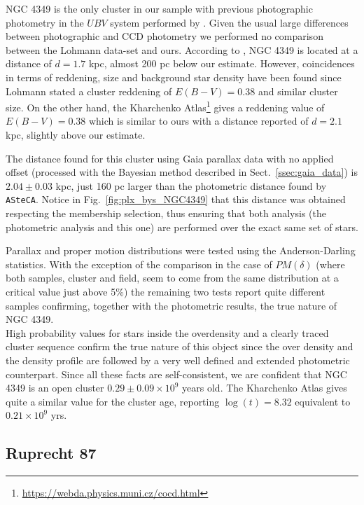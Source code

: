 \documentclass[draft]{aa}
\begin{document}
NGC 4349 is the only cluster in our sample with previous photographic photometry
in the $UBV$ system performed by \cite{Lohmann_1961}. Given the usual large
differences between photographic and CCD photometry we performed no comparison
between the Lohmann data-set and ours. According to \cite{Lohmann_1961}, NGC
4349 is located at a distance of $d=1.7$ kpc, almost 200 pc below our estimate.
However, coincidences in terms of reddening, size and background star density
have been found since Lohmann stated a cluster reddening of $E(B-V)=0.38$
and similar cluster size. On the other hand, the Kharchenko
Atlas\footnote{\url{https://webda.physics.muni.cz/cocd.html}}
\citep{Kharchenko_2005} gives a reddening value of $E(B-V)=0.38$ which is
similar to ours with a distance reported of $d=2.1$ kpc, slightly
above our estimate.

The distance found for this cluster using Gaia parallax data with no applied
offset (processed with the Bayesian method described in
Sect.~\ref{ssec:gaia_data}) is $2.04\pm0.03$ kpc, just 160 pc
larger than the photometric distance found by \texttt{ASteCA}.
Notice in Fig.~\ref{fig:plx_bys_NGC4349} that this distance was obtained
respecting the membership selection, thus ensuring that both analysis 
(the photometric analysis and this one) are performed over the exact same set
of stars.

Parallax and proper motion distributions were tested using the Anderson-Darling
statistics. With the exception of the comparison in the case of $PM(\delta)$
(where both samples, cluster and field, seem to come from the same distribution
at a critical value just above 5\%) the remaining two tests report quite
different samples confirming, together with the photometric results, the true
nature of NGC 4349.\\

High probability values for stars inside the overdensity and a clearly traced
cluster sequence confirm the true nature of this object since the over density
and the density profile are followed by a very well defined and extended
photometric counterpart.
Since all these facts are self-consistent, we are confident that NGC 4349 is
an open cluster $0.29\pm0.09\times10^9$ years old.
The Kharchenko Atlas gives quite a similar value for the cluster age, reporting
$\log(t)=8.32$ equivalent to $0.21\times10^9$ yrs.




\subsection{Ruprecht 87}
\end{document}
